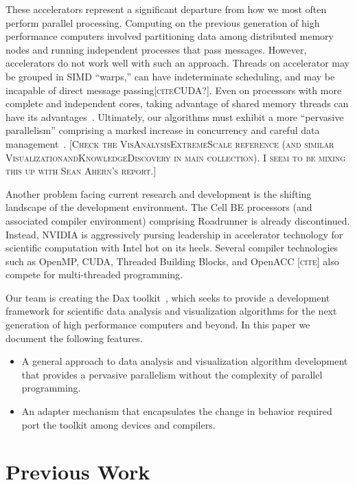 \documentclass{sig-alternate}
\newcommand*{\lcite}[1]{~\cite{#1}}
\newcommand{\fix}[1]{{\color{red}\textsc{[#1]}}}
\begin{document}
These accelerators represent a significant departure from how we most often
perform parallel processing.  Computing on the previous generation of high
performance computers involved partitioning data among distributed memory
nodes and running independent processes that pass messages.  However,
accelerators do not work well with such an approach.  Threads on
accelerator may be grouped in SIMD ``warps,'' can have indeterminate
scheduling, and may be incapable of direct message passing\fix{citeCUDA?}.
Even on processors with more complete and independent cores, taking
advantage of shared memory threads can have its
advantages\lcite{Camp2010,Howison2011}.  Ultimately, our algorithms must
exhibit a more ``pervasive parallelism'' comprising a marked increase in
concurrency and careful data
management\lcite{VisAnalysisExtremeScale,ExascaleRoadMap}. \fix{Check the
  VisAnalysisExtremeScale reference (and similar
  VisualizationandKnowledgeDiscovery in main collection).  I seem to be
  mixing this up with Sean Ahern's report.}

Another problem facing current research and development is the shifting
landscape of the development environment.  The Cell BE processors (and
associated compiler environment) comprising Roadrunner is already
discontinued.  Instead, NVIDIA is aggressively pursing leadership in
accelerator technology for scientific computation with Intel hot on its
heels.  Several compiler technologies such as OpenMP, CUDA, Threaded
Building Blocks, and OpenACC \fix{cite} also compete for multi-threaded
programming.

Our team is creating the Dax toolkit\lcite{Moreland2011:LDAV}, which seeks
to provide a development framework for scientific data analysis and
visualization algorithms for the next generation of high performance
computers and beyond.  In this paper we document the following features.
\begin{itemize}
\item A general approach to data analysis and visualization algorithm
  development that provides a pervasive parallelism without the complexity
  of parallel programming.
\item An adapter mechanism that encapsulates the change in behavior
  required port the toolkit among devices and compilers.
\end{itemize}

\section{Previous Work}
\label{sec:PreviousWork}
\end{document}

